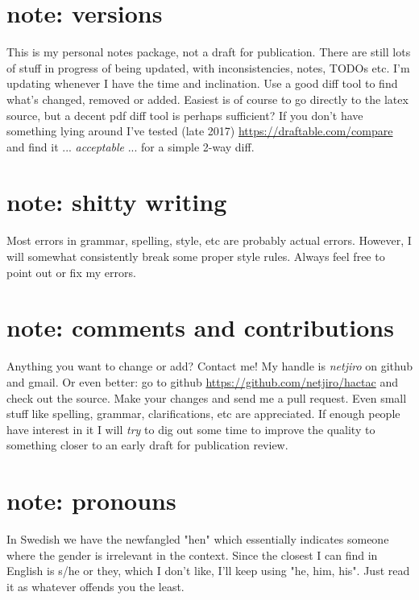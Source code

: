 \documentclass[11pt, twoside, titlepage, a4paper]{report}
\begin{document}
\newpage
\section*{note: versions}
This is my personal notes package, not a draft for publication. There are still lots of stuff in progress of being updated, with inconsistencies, notes, TODOs etc.
I'm updating whenever I have the time and inclination. Use a good diff tool to find what's changed, removed or added. Easiest is of course to go directly to the latex source, but a decent pdf diff tool is perhaps sufficient? If you don't have something lying around I've tested (late 2017) \url{https://draftable.com/compare} and find it ... \emph{acceptable} ... for a simple 2-way diff. %


\section*{note: shitty writing}
Most errors in grammar, spelling, style, etc are probably actual errors. However, I will somewhat consistently break some proper style rules. Always feel free to point out or fix my errors.


\section*{note: comments and contributions}
Anything you want to change or add? Contact me! My handle is \emph{netjiro} on github and gmail. Or even better: go to github \url{https://github.com/netjiro/hactac} and check out the source. Make your changes and send me a pull request. Even small stuff like spelling, grammar, clarifications, etc are appreciated. If enough people have interest in it I will \emph{try} to dig out some time to improve the quality to something closer to an early draft for publication review.


\section*{note: pronouns}
In Swedish we have the newfangled "hen" which essentially indicates someone where the gender is irrelevant in the context. Since the closest I can find in English is s/he or they, which I don't like, I'll keep using "he, him, his". Just read it as whatever offends you the least.
\end{document}
